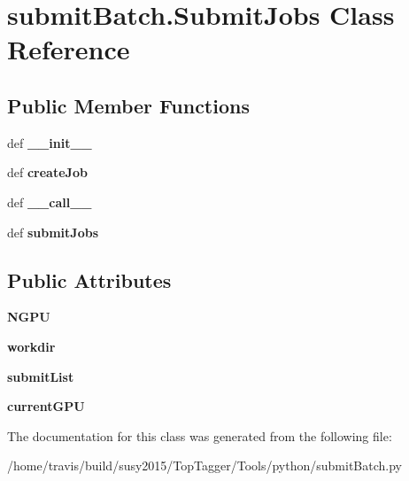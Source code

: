 \hypertarget{classsubmitBatch_1_1SubmitJobs}{\section{submit\-Batch.\-Submit\-Jobs Class Reference}
\label{classsubmitBatch_1_1SubmitJobs}
}
\subsection*{Public Member Functions}
\begin{DoxyCompactItemize}
\item 
\hypertarget{classsubmitBatch_1_1SubmitJobs_a843ed65a4017b4af7cf04e0b21140933}{def {\bfseries \-\_\-\-\_\-init\-\_\-\-\_\-}}\label{classsubmitBatch_1_1SubmitJobs_a843ed65a4017b4af7cf04e0b21140933}

\item 
\hypertarget{classsubmitBatch_1_1SubmitJobs_a6a4ec898aeef0cea46bb18ff8c3f385d}{def {\bfseries create\-Job}}\label{classsubmitBatch_1_1SubmitJobs_a6a4ec898aeef0cea46bb18ff8c3f385d}

\item 
\hypertarget{classsubmitBatch_1_1SubmitJobs_ab412ebdf6ba64e5186c084220e87bd87}{def {\bfseries \-\_\-\-\_\-call\-\_\-\-\_\-}}\label{classsubmitBatch_1_1SubmitJobs_ab412ebdf6ba64e5186c084220e87bd87}

\item 
\hypertarget{classsubmitBatch_1_1SubmitJobs_abe5167df9140c659b9014c7a24cd1b51}{def {\bfseries submit\-Jobs}}\label{classsubmitBatch_1_1SubmitJobs_abe5167df9140c659b9014c7a24cd1b51}

\end{DoxyCompactItemize}
\subsection*{Public Attributes}
\begin{DoxyCompactItemize}
\item 
\hypertarget{classsubmitBatch_1_1SubmitJobs_aa75a76efda487ad51213e50f4117e216}{{\bfseries N\-G\-P\-U}}\label{classsubmitBatch_1_1SubmitJobs_aa75a76efda487ad51213e50f4117e216}

\item 
\hypertarget{classsubmitBatch_1_1SubmitJobs_a10fc4d33c8173a5f02e8a2b8eeb36a63}{{\bfseries workdir}}\label{classsubmitBatch_1_1SubmitJobs_a10fc4d33c8173a5f02e8a2b8eeb36a63}

\item 
\hypertarget{classsubmitBatch_1_1SubmitJobs_ab4cc17bbaefd9389d791a0f45a9acef7}{{\bfseries submit\-List}}\label{classsubmitBatch_1_1SubmitJobs_ab4cc17bbaefd9389d791a0f45a9acef7}

\item 
\hypertarget{classsubmitBatch_1_1SubmitJobs_ac2efb2678325fd2ab80c028dc7e5e784}{{\bfseries current\-G\-P\-U}}\label{classsubmitBatch_1_1SubmitJobs_ac2efb2678325fd2ab80c028dc7e5e784}

\end{DoxyCompactItemize}


The documentation for this class was generated from the following file\-:\begin{DoxyCompactItemize}
\item 
/home/travis/build/susy2015/\-Top\-Tagger/\-Tools/python/submit\-Batch.\-py\end{DoxyCompactItemize}
